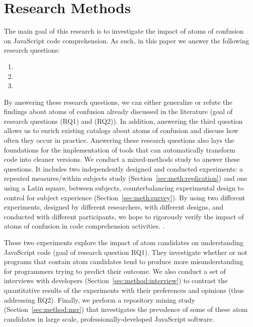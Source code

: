 \section{Research Methods}
\label{method}

The main goal of this research is to investigate the impact of atoms of confusion on JavaScript code comprehension. As such, in this paper we answer the following research questions: 

\begin{enumerate}[(RQ1)]
\item \rqa 
\item \rqb
\item \rqd
\end{enumerate}

By answering these research questions, we can either generalize or refute the findings about atoms of confusion already discussed in the literature (goal of research questions (RQ1) and (RQ2)). 
In addition, answering the third question allows us to enrich existing catalogs about atoms of confusion and discuss how often they occur in practice. Answering these research questions also lays the foundations for the implementation of tools that can automatically transform code into cleaner versions.
We conduct a mixed-methods study to answer these questions. 
It includes two independently designed and conducted experiments: a repeated measures/within subjects study (Section~\ref{sec:meth:replication}) and one using a Latin square, between subjects, counterbalancing experimental design to control for subject experience (Section~\ref{sec:meth:survey}). By using two different experiments, designed by different researchers, with different designs, and conducted with different participants, we hope to rigorously verify the impact of atoms of confusion in code comprehension activities. .

These two experiments explore the impact of atom candidates on understanding JavaScript code (goal of research question RQ1). They investigate whether or not programs that contain atom candidates tend to produce more misunderstanding for programmers trying to predict their outcome.%
We also conduct a set of interviews with developers (Section~\ref{sec:method:interview}) to contrast the quantitative results of the experiments with their preferences and opinions (thus addressing RQ2). Finally, we perform a repository mining study (Section~\ref{sec:method:msr}) that investigates the prevalence of some of these atom candidates in large scale, professionally-developed JavaScript software.


